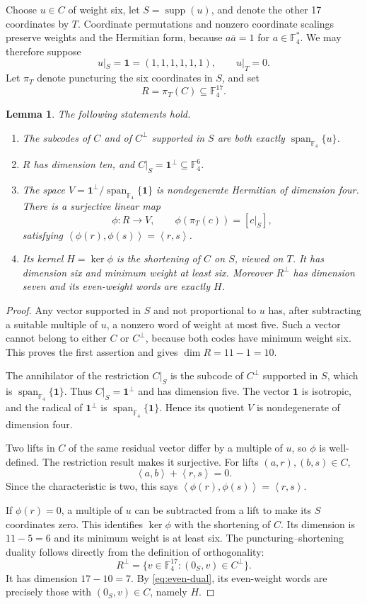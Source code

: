 \documentclass[11pt]{article}
\newtheorem{lemma}[theorem]{Lemma}
\theoremstyle{remark}
\newcommand{\F}{\mathbb F_4}
\newcommand{\Span}{\operatorname{span}_{\F}}
\newcommand{\ip}[2]{\left\langle #1,#2\right\rangle}
\newcommand{\supp}{\operatorname{supp}}
\begin{document}
Choose $u\in C$ of weight six, let $S=\supp(u)$, and denote the other
17 coordinates by $T$.  Coordinate permutations and nonzero coordinate
scalings preserve weights and the Hermitian form, because $a\bar a=1$
for $a\in\F^*$.  We may therefore suppose
\[
 u|_S=\boldsymbol1=(1,1,1,1,1,1),\qquad u|_T=0.
\]
Let $\pi_T$ denote puncturing the six coordinates in $S$, and set
\[
 R=\pi_T(C)\subseteq\F^{17}.
\]

\begin{lemma}\label{lem:residual}
The following statements hold.
\begin{enumerate}
\item The subcodes of $C$ and of $C^\perp$ supported in $S$ are both
      exactly $\Span\{u\}$.
\item $R$ has dimension ten, and $C|_S=\boldsymbol1^\perp\subseteq\F^6$.
\item The space
      $V=\boldsymbol1^\perp/\Span\{\boldsymbol1\}$ is nondegenerate
      Hermitian of dimension four.  There is a surjective linear map
      \[
       \phi:R\longrightarrow V,\qquad
       \phi(\pi_T(c))=[c|_S],
      \]
      satisfying $\ip{\phi(r)}{\phi(s)}=\ip{r}{s}$.
\item Its kernel $H=\ker\phi$ is the shortening of $C$ on $S$,
      viewed on $T$.  It has dimension six and minimum weight at least six.
      Moreover $R^\perp$ has dimension seven and its even-weight words
      are exactly $H$.
\end{enumerate}
\end{lemma}

\begin{proof}
Any vector supported in $S$ and not proportional to $u$ has, after
subtracting a suitable multiple of $u$, a nonzero word of weight at most
five.  Such a vector cannot belong to either $C$ or $C^\perp$, because
both codes have minimum weight six.  This proves the first assertion
and gives $\dim R=11-1=10$.

The annihilator of the restriction $C|_S$ is the subcode of $C^\perp$
supported in $S$, which is $\Span\{\boldsymbol1\}$.  Thus
$C|_S=\boldsymbol1^\perp$ and has dimension five.  The vector
$\boldsymbol1$ is isotropic, and the radical of
$\boldsymbol1^\perp$ is $\Span\{\boldsymbol1\}$.  Hence its quotient
$V$ is nondegenerate of dimension four.

Two lifts in $C$ of the same residual vector differ by a multiple of $u$,
so $\phi$ is well-defined.  The restriction result makes it surjective.
For lifts $(a,r),(b,s)\in C$,
\[
 \ip{a}{b}+\ip{r}{s}=0.
\]
Since the characteristic is two, this says
$\ip{\phi(r)}{\phi(s)}=\ip{r}{s}$.

If $\phi(r)=0$, a multiple of $u$ can be subtracted from a lift to
make its $S$ coordinates zero.  This identifies $\ker\phi$ with the
shortening of $C$.  Its dimension is $11-5=6$ and its minimum weight
is at least six.  The puncturing--shortening duality follows directly
from the definition of orthogonality:
\[
 R^\perp=\{v\in\F^{17}:(0_S,v)\in C^\perp\}.
\]
It has dimension $17-10=7$.  By \eqref{eq:even-dual}, its even-weight
words are precisely those with $(0_S,v)\in C$, namely $H$.
\end{proof}
\end{document}
